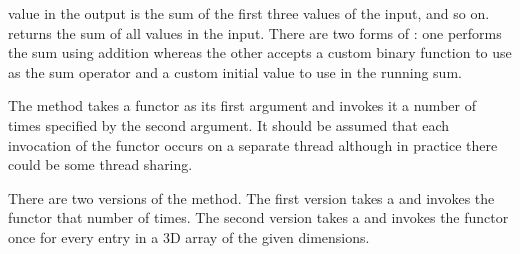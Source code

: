 \begin{description}
  value in the output is the sum of the first three values of the input,
  and so on.  returns the sum of all values in the
  input. There are two forms of : one performs the
  sum using addition whereas the other accepts a custom binary function to
  use as the sum operator and a custom initial value to use in the running
  sum.
\item[\textcode{Schedule}]  The  method
  takes a functor as its first argument and invokes it a number of times
  specified by the second argument. It should be assumed that each
  invocation of the functor occurs on a separate thread although in
  practice there could be some thread sharing.

  There are two versions of the  method. The first
  version takes a  and invokes the functor that number of
  times. The second version takes a  and invokes the functor once
  for every entry in a 3D array of the given dimensions.


\end{description}
